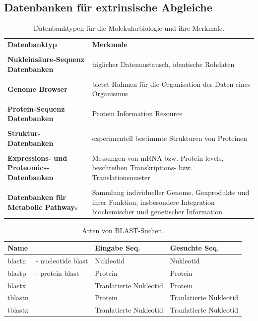 \subsection{Datenbanken für extrinsische Abgleiche} 
\begin{table}[H]
    \centering
    \begin{tabular}{p{8cm}p{7cm}}
      \textbf{Datenbanktyp}   & \textbf{Merkmale} \\ \\
      \textbf{Nukleinsäure-Sequenz Datenbanken } & täglicher Datenaustausch, identische Rohdaten  \\ \\ \index{Datenbank!Nukleinsäure-Sequenz}
       \textbf{Genome Browser } &  bietet Rahmen für die Organisation der Daten eines
Organismus\\ \\
        \textbf{Protein-Sequenz Datenbanken} &  Protein Information Resource \\ \\ \index{Datenbank!Protein-Sequenz}
       \textbf{ Struktur-Datenbanken} &  experimentell bestimmte Strukturen von Proteinen\\ \\ \index{Datenbank!Struktur-} 
       \textbf{Expressions- und Proteomics-Datenbanken}  &  Messungen von mRNA bzw. Protein levels, beschreiben Transkriptions- bzw. Translationsmuster\\ \\ \index{Datenbank!Proteomics-} \index{Datenbank!Expressions}
        \textbf{Datenbanken für Metabolic Pathway}s & Sammlung individueller Genome, Genprodukte und ihrer Funktion, insbesondere Integration biochemischer und genetischer Information \index{Datenbank!Metabolic Pathway}
    \end{tabular}
    \caption{Datenbanktypen für die Molekularbiologie und ihre Merkmale.}
    \label{tab:my_label}
\end{table}

\begin{table}[H]
    \centering
    \begin{tabular}{l l|l|l}
    \textbf{Name} & & \textbf{Eingabe Seq.} & \textbf{Gesuchte Seq.} \\ \hline
        blastn & - nucleotide blast  & Nukleotid & Nukleotid  \\
        blastp & - protein blast & Protein & Protein \\
        blastx & & Tranlatierte Nukleotid & Protein \\
        tblastn & & Protein & Tranlatierte Nukleotid \\
        tblastx & & Tranlatierte Nukleotid & Tranlatierte Nukleotid 
    \end{tabular}
    \caption{Arten von BLAST-Suchen.}
    \label{tab:my_label}
\end{table}

